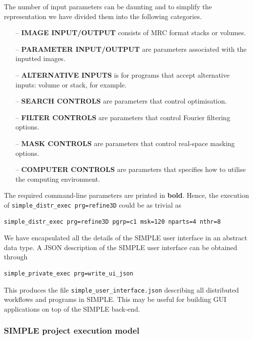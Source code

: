 \documentclass[a4paper,11pt]{article}
\begin{document}
\noindent{}The number of input parameters can be daunting and to simplify the representation we have divided them into the following categories.

\begin{itemize}
    \item[--] \textbf{IMAGE INPUT/OUTPUT} consists of MRC format stacks or volumes.
    \item[--] \textbf{PARAMETER INPUT/OUTPUT} are parameters associated with the inputted images.
    \item[--] \textbf{ALTERNATIVE INPUTS} is for programs that accept alternative inputs: volume or stack, for example.
    \item[--] \textbf{SEARCH CONTROLS} are parameters that control optimisation.
    \item[--] \textbf{FILTER CONTROLS} are parameters that control Fourier filtering options.
    \item[--] \textbf{MASK CONTROLS} are parameters that control real-space masking options.
    \item[--] \textbf{COMPUTER CONTROLS} are parameters that specifies how to utilise the computing environment.
\end{itemize}

\noindent{}The required command-line parameters are printed in \textbf{bold}. Hence, the execution of  \texttt{simple\_distr\_exec prg=refine3D} could be as trivial as

\begin{Verbatim}[commandchars=+\[\],fontsize=\small,breaklines=true]
simple_distr_exec prg=refine3D pgrp=c1 msk=120 nparts=4 nthr=8
\end{Verbatim}

\noindent{}We have encapsulated all the details of the SIMPLE user interface in an abstract data type. A JSON description of the SIMPLE user interface can be obtained through 

\begin{Verbatim}[commandchars=+\[\],fontsize=\small,breaklines=true]
simple_private_exec prg=write_ui_json
\end{Verbatim}

\noindent{}This produces the file \texttt{simple\_user\_interface.json} describing all distributed workflows and programs in SIMPLE. This may be useful for building GUI applications on top of the SIMPLE back-end.

\subsubsection{SIMPLE project execution model}
\end{document}
